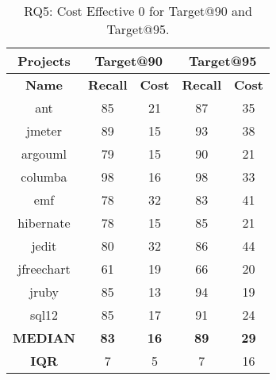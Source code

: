 \begin{table}[!t]
\centering
\caption{RQ5: Cost Effective {\IT}0 for Target@90 and Target@95.}
\label{table rq5 90 95}
\begin{tabular}{|c||c|c|c|c|}
\hline
\multicolumn{1}{|c||}{\textbf{Projects}} & 
\multicolumn{2}{c|}{\textbf{Target@90}} &
\multicolumn{2}{c|}{\textbf{Target@95}} \\ 
\hline
\textbf{Name} & 
\textbf{Recall} & \textbf{Cost} &
\textbf{Recall} & \textbf{Cost} \\
\hline
ant  & 
85 & 21 &
87 & 35 \\
\hline
jmeter & 
89 & 15 &
93 & 38 \\
\hline
argouml & 
79 & 15 &
90 & 21 \\
\hline
columba & 
98 & 16 &
98 & 33 \\
\hline
emf & 
78 & 32 &
83 & 41 \\
\hline
hibernate & 
78 & 15 &
85 & 21 \\
\hline
jedit & 
80 & 32 &
86 & 44 \\
\hline
jfreechart & 
61 & 19 &
66 & 20 \\
\hline
jruby & 
85 & 13 &
94 & 19 \\
\hline
sql12 & 
85 & 17 &
91 & 24 \\
\hline
\hline
\textbf{MEDIAN} & 
\textbf{83} & \textbf{16} &
\textbf{89} & \textbf{29} \\
\hline
\textbf{IQR} & 
7 & 5 &
7 & 16 \\
\hline
\end{tabular}
\end{table}